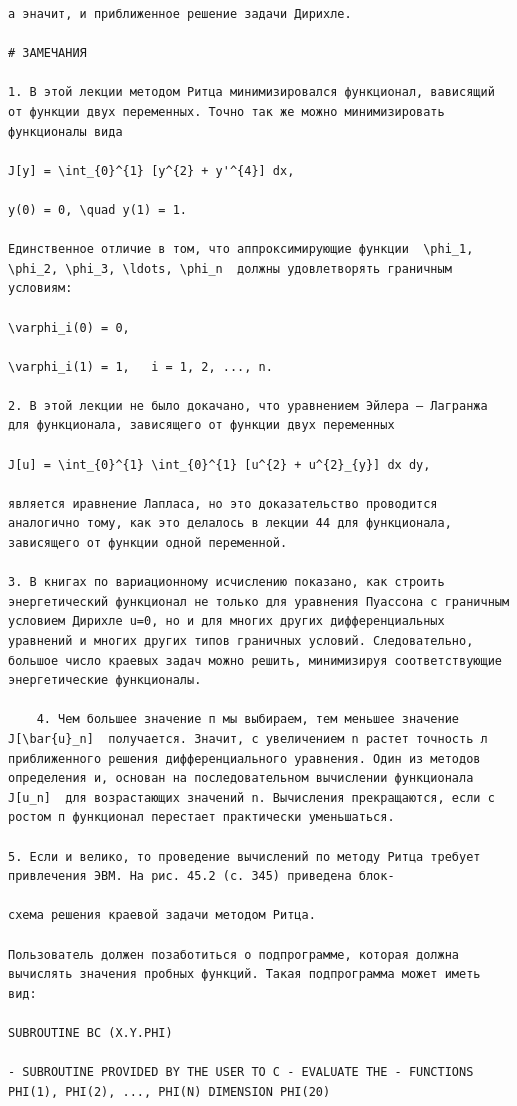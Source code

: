 \documentclass[
  ukrainian,
]{article}
\begin{document}
\begin{verbatim}
а эначит, и приближенное решение задачи Дирихле.

# ЗАМЕЧАНИЯ

1. В этой лекции методом Ритца минимизировался функционал, вависящий от функции двух переменных. Точно так же можно минимизировать функционалы вида

J[y] = \int_{0}^{1} [y^{2} + y'^{4}] dx,

y(0) = 0, \quad y(1) = 1.

Единственное отличие в том, что аппроксимирующие функции  \phi_1, \phi_2, \phi_3, \ldots, \phi_n  должны удовлетворять граничным условиям:

\varphi_i(0) = 0,

\varphi_i(1) = 1,   i = 1, 2, ..., n.

2. В этой лекции не было докачано, что уравнением Эйлера — Лагранжа для функционала, зависящего от функции двух переменных

J[u] = \int_{0}^{1} \int_{0}^{1} [u^{2} + u^{2}_{y}] dx dy,

является иравнение Лапласа, но это доказательство проводится аналогично тому, как это делалось в лекции 44 для функционала, зависящего от функции одной переменной.

3. В книгах по вариационному исчислению показано, как строить энергетический функционал не только для уравнения Пуассона с граничным условием Дирихле u=0, но и для многих других дифференциальных уравнений и многих других типов граничных условий. Следовательно, большое число краевых задач можно решить, минимизируя соответствующие энергетические функционалы.

    4. Чем большее значение п мы выбираем, тем меньшее значение  J[\bar{u}_n]  получается. Значит, с увеличением n растет точность л приближенного решения дифференциального уравнения. Один из методов определения и, основан на последовательном вычислении функционала  J[u_n]  для возрастающих значений n. Вычисления прекращаются, если с ростом п функционал перестает практически уменьшаться.

5. Если и велико, то проведение вычислений по методу Ритца требует привлечения ЭВМ. На рис. 45.2 (с. 345) приведена блок-

схема решения краевой задачи методом Ритца.

Пользователь должен позаботиться о подпрограмме, которая должна вычислять значения пробных функций. Такая подпрограмма может иметь вид:

SUBROUTINE BC (X.Y.PHI)

- SUBROUTINE PROVIDED BY THE USER TO C - EVALUATE THE - FUNCTIONS PHI(1), PHI(2), ..., PHI(N) DIMENSION PHI(20)


\end{verbatim}
\end{document}
